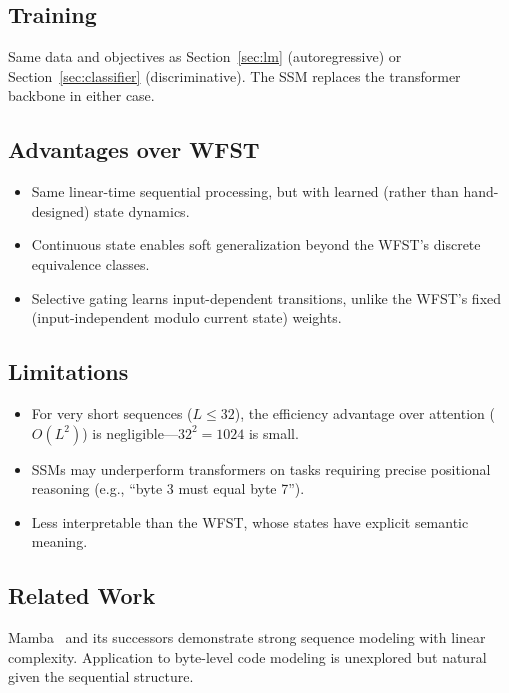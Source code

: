 \documentclass{article}
\begin{document}
\subsection{Training}

Same data and objectives as Section~\ref{sec:lm} (autoregressive) or
Section~\ref{sec:classifier} (discriminative).  The SSM replaces the
transformer backbone in either case.

\subsection{Advantages over WFST}

\begin{itemize}
  \item Same linear-time sequential processing, but with learned
        (rather than hand-designed) state dynamics.
  \item Continuous state enables soft generalization beyond the WFST's
        discrete equivalence classes.
  \item Selective gating learns input-dependent transitions, unlike the
        WFST's fixed (input-independent modulo current state) weights.
\end{itemize}

\subsection{Limitations}

\begin{itemize}
  \item For very short sequences ($L \leq 32$), the efficiency advantage
        over attention ($O(L^2)$) is negligible---$32^2 = 1024$ is small.
  \item SSMs may underperform transformers on tasks requiring precise
        positional reasoning (e.g., ``byte 3 must equal byte 7'').
  \item Less interpretable than the WFST, whose states have explicit
        semantic meaning.
\end{itemize}

\subsection{Related Work}

Mamba~\cite{gu2024mamba} and its successors demonstrate strong sequence
modeling with linear complexity.  Application to byte-level code modeling
is unexplored but natural given the sequential structure.
\end{document}
